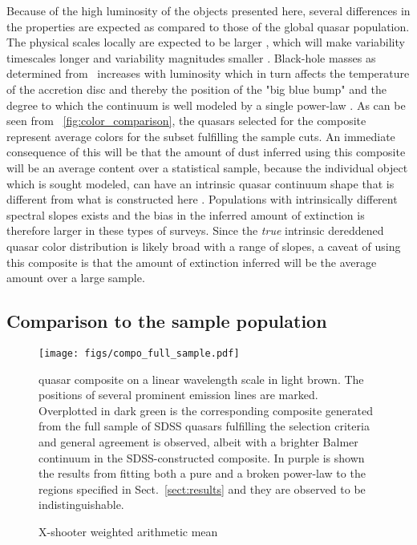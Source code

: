 \documentclass{aa}    %
\newcommand{\figref}[1]{\ref{fig:#1}}
\newcommand{\Fig}[1]{\figurename~\figref{#1}}
\newcommand{\fig}[1]{\Fig{#1}}
\newcommand{\figlabel}[1]{\label{fig:#1}}
\newcommand{\sectionname}{Sect.}
\newcommand{\Sect}[1]{\sectionname~\ref{sect:#1}}
\newcommand{\sect}[1]{\Sect{#1}}
\newcommand{\sectlabel}[1]{\label{sect:#1}}
\newcommand{\mgii}{\ion{Mg}{ii}}
\begin{document}
Because of the high luminosity of the objects presented here, several
differences in the properties are expected as compared to those of the
global quasar population. The physical scales locally are expected to
be larger \citep{Bentz2013}, which will make variability timescales
longer and variability magnitudes smaller \citep{VandenBerk2004,
  Schmidt2012}. Black-hole masses as determined from \mgii~increases
with luminosity \citep{wu2015} which in turn affects the temperature
of the accretion disc \citep{shakura1973, Pereyra2006} and thereby the
position of the "big blue bump" and the degree to which the continuum
is well modeled by a single power-law \citep[see also][for a
  discussion]{Lusso2015}. As can be seen from \fig{color_comparison},
the quasars selected for the composite represent average colors for
the subset fulfilling the sample cuts. An immediate consequence of
this will be that the amount of dust inferred using this composite
will be an average content over a statistical sample, because the
individual object which is sought modeled, can have an intrinsic
quasar continuum shape that is different from what is constructed here
\citep{Richards2003, Hopkins2004}. Populations with intrinsically
different spectral slopes exists \citep{Glikman2012, Krawczyk2015} and
the bias in the inferred amount of extinction is therefore larger in
these types of surveys. Since the \textit{true} intrinsic dereddened
quasar color distribution is likely broad with a range of slopes, a
caveat of using this composite is that the amount of extinction
inferred will be the average amount over a large sample.



\subsection{Comparison to the sample population}  \sectlabel{sample_pop}


\begin{figure*}[t!]
\centering
\texttt{[image: figs/compo\_full\_sample.pdf]}
\caption[]{X-shooter weighted arithmetic mean} quasar composite on a linear wavelength
scale in light brown. The positions of several prominent emission lines are
marked. Overplotted in dark green is the corresponding composite generated from
the full sample of SDSS quasars fulfilling the selection criteria and general
agreement is observed, albeit with a brighter Balmer continuum in the
SDSS-constructed composite. In purple is shown the results from fitting both a
pure and a broken power-law to the regions specified in \sect{results} and they
are observed to be indistinguishable.
\figlabel{composite}
\end{figure*}
\end{document}
